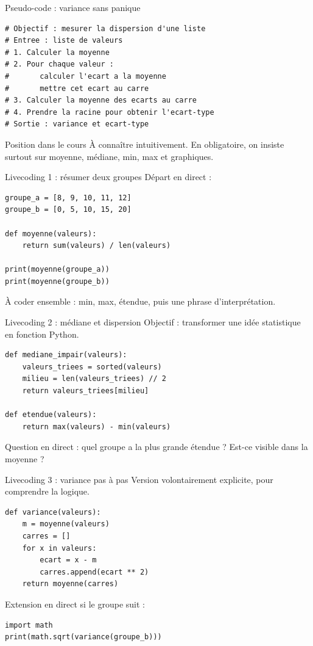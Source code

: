 \documentclass[10pt,aspectratio=169]{beamer}
\begin{document}
\begin{frame}[fragile]{Pseudo-code : variance sans panique}
\begin{lstlisting}
# Objectif : mesurer la dispersion d'une liste
# Entree : liste de valeurs
# 1. Calculer la moyenne
# 2. Pour chaque valeur :
#       calculer l'ecart a la moyenne
#       mettre cet ecart au carre
# 3. Calculer la moyenne des ecarts au carre
# 4. Prendre la racine pour obtenir l'ecart-type
# Sortie : variance et ecart-type
\end{lstlisting}
\begin{block}{Position dans le cours}
À connaître intuitivement. En obligatoire, on insiste surtout sur moyenne, médiane, min, max et graphiques.
\end{block}
\end{frame}

\begin{frame}[fragile]{Livecoding 1 : résumer deux groupes}
Départ en direct :
\begin{lstlisting}
groupe_a = [8, 9, 10, 11, 12]
groupe_b = [0, 5, 10, 15, 20]

def moyenne(valeurs):
    return sum(valeurs) / len(valeurs)

print(moyenne(groupe_a))
print(moyenne(groupe_b))
\end{lstlisting}
À coder ensemble : min, max, étendue, puis une phrase d'interprétation.
\end{frame}

\begin{frame}[fragile]{Livecoding 2 : médiane et dispersion}
Objectif : transformer une idée statistique en fonction Python.
\begin{lstlisting}
def mediane_impair(valeurs):
    valeurs_triees = sorted(valeurs)
    milieu = len(valeurs_triees) // 2
    return valeurs_triees[milieu]

def etendue(valeurs):
    return max(valeurs) - min(valeurs)
\end{lstlisting}
Question en direct : quel groupe a la plus grande étendue ? Est-ce visible dans la moyenne ?
\end{frame}

\begin{frame}[fragile]{Livecoding 3 : variance pas à pas}
Version volontairement explicite, pour comprendre la logique.
\begin{lstlisting}
def variance(valeurs):
    m = moyenne(valeurs)
    carres = []
    for x in valeurs:
        ecart = x - m
        carres.append(ecart ** 2)
    return moyenne(carres)
\end{lstlisting}
Extension en direct si le groupe suit :
\begin{lstlisting}
import math
print(math.sqrt(variance(groupe_b)))
\end{lstlisting}
\end{frame}
\end{document}
